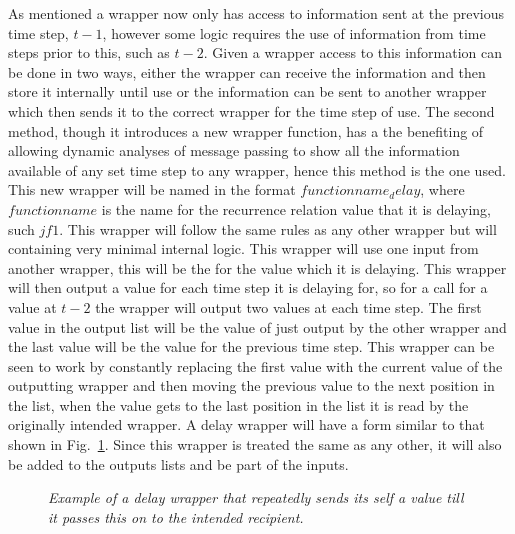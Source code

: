 \documentclass{article}
\begin{document}
As mentioned a wrapper now only has access to information sent at the previous time step, $t-1$, however some logic requires the use of information from time steps prior to this, such as $t-2$. Given a wrapper access to this information can be done in two ways, either the wrapper can receive the information and then store it internally until use or the information can be sent to another wrapper which then sends it to the correct wrapper for the time step of use. The second method, though it introduces a new wrapper function, has a the benefiting of allowing dynamic analyses of message passing to show all the information available of any set time step to any wrapper, hence this method is the one used. This new wrapper will be named in the format $functionname_delay$, where $functionname$ is the name for the recurrence relation value that it is delaying, such $jf1$. This wrapper will follow the same rules as any other wrapper but will containing very minimal internal logic. This wrapper will use one input from another wrapper, this will be the for the value which it is delaying. This wrapper will then output a value for each time step it is delaying for, so for a call for a value at $t-2$ the wrapper will output two values at each time step. The first value in the output list will be the value of just output by the other wrapper and the last value will be the value for the previous time step. This wrapper can be seen to work by constantly replacing the first value with the current value of the outputting wrapper and then moving the previous value to the next position in the list, when the value gets to the last position in the list it is read by the originally intended wrapper. A delay wrapper will have a form similar to that shown in Fig.~\ref{fig:delay4}. Since this wrapper is treated the same as any other, it will also be added to the outputs lists and be part of the inputs. 
\begin{figure}[H]
	\centering
	
	\caption{\it Example of a delay wrapper that repeatedly sends its self a value till it passes this on to the intended recipient.}
	\label{fig:delay4}
\end{figure} 
  
\end{document}
